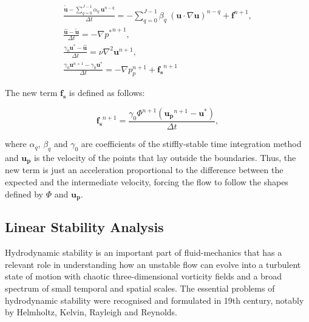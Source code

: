 \begin{subequations}
\begin{gather}
    \frac{\mathbf{\tilde{u}}-\sum_{q=0}^{J-1}\alpha_q~\mathbf{u}^{n-q}}
        {\Delta t} = -\sum_{q=0}^{J-1}\beta_q~(\mathbf{u}\cdot
        \nabla\mathbf{u})^{n-q} + \mathbf{f}^{n+1},\\
    \frac{\mathbf{\hat{u}}-\mathbf{\tilde{u}}}{\Delta t} =
        -\nabla {p^*}^{n+1},\\[3mm]
    \frac{\gamma_0\mathbf{u^*}-\mathbf{\hat{u}}}{\Delta t} =
        \nu\nabla^2\mathbf{u}^{n+1},\\[3mm]
    \frac{\gamma_0\mathbf{u}^{n+1}-\gamma_0\mathbf{u^*}}{\Delta t} =
        -\nabla p_p^{n+1} + \mathbf{f_s}^{n+1}
\end{gather}
\end{subequations}

The new term $\mathbf{f_s}$ is defined as follows:

\begin{equation}
    \mathbf{f_s}^{n+1} = \frac{\gamma_0\Phi^{n+1}(\mathbf{u_p}^{n+1}-
        \mathbf{u^*})}{\Delta t},
\end{equation}

where $\alpha_q$, $\beta_q$ and $\gamma_0$ are coefficients of the
stiffly-stable time integration method and $\mathbf{u_p}$ is the velocity of
the points that lay outside the boundaries. Thus, the new term is just an
acceleration proportional to the difference between the expected and the
intermediate velocity, forcing the flow to follow the shapes defined by $\Phi$
and $\mathbf{u_p}$. 

\subsection{Linear Stability Analysis}

Hydrodynamic stability is an important part of fluid-mechanics that has a relevant role in understanding how an unstable flow can evolve into a turbulent state of motion with chaotic three-dimensional vorticity fields and a broad spectrum of small temporal and spatial scales. The essential problems of hydrodynamic stability were recognised and formulated in 19th century, notably by Helmholtz, Kelvin, Rayleigh and Reynolds.

